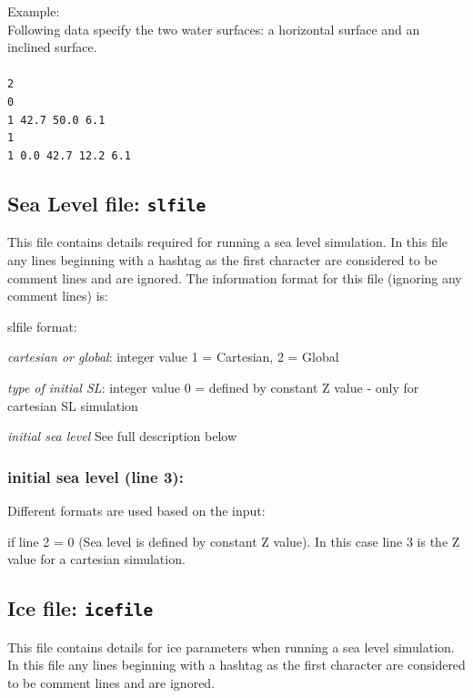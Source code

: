 Example:\\
Following data specify the two water surfaces: a horizontal surface and an inclined surface.\\\\
\texttt{2\\
0\\
1 42.7 50.0 6.1\\
1\\
1 0.0 42.7 12.2 6.1}\\




\subsection{Sea Level file: \texttt{slfile}}

This file contains details required for running a sea level simulation.
In this file any lines beginning with a hashtag as the first character are considered
to be comment lines and are ignored. The information format for this file (ignoring any comment lines) is: 


\begin{adescription}{slfile format:}
\item[line 1:]        \emph{cartesian or global}: integer value 1 = Cartesian, 2 = Global
\item[line 2:]        \emph{type of initial SL}: integer value 0 = defined by constant Z value - only for cartesian SL simulation  
\item[line 3:]        \emph{initial sea level} See full description below \\ 
\end{adescription}



\subsubsection{initial sea level (line 3):}
Different formats are used based on the input: 

if line 2 = 0 (Sea level is defined by constant Z value). In this case line 3 is the Z value for a cartesian simulation.


\subsection{Ice file: \texttt{icefile}}

This file contains details for ice parameters when running a sea level simulation.
In this file any lines beginning with a hashtag as the first character are considered
to be comment lines and are ignored. \\ 

